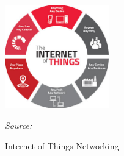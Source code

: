 \begin{figure}[h]
    \centering
    \includegraphics[width=0.4\textwidth]{img/bp/iot-concept.jpg}
    \caption{Internet of Things Networking}
    \label{fig:Figuur8}
    \textit{Source: \autocite{Dauwed2018}}
\end{figure}



